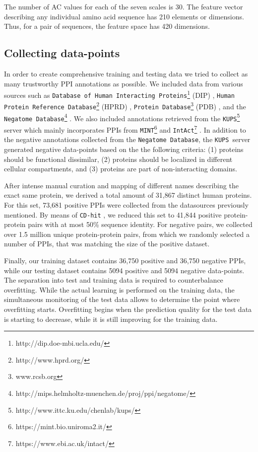 \documentclass[3p,times,twocolumn]{elsarticle}
\newcommand{\nega}{\texttt{Negatome Database}}
\newcommand{\kups}{\texttt{KUPS}}
\begin{document}
The number of AC values for each of the seven scales is 30. 
The feature vector describing any individual amino acid sequence has 210 elements or dimensions.
Thus, for a pair of sequences, the feature space has 420 dimensions. 


\subsection{Collecting data-points}
In order to create comprehensive training and testing data we tried to
collect as many trustworthy PPI annotations as possible. We included
data from various sources such as \texttt{Database of Human
  Interacting Proteins}\footnote{http://dip.doe-mbi.ucla.edu/} (DIP)
\cite{Salwinski:2004}, \texttt{Human Protein Reference
  Database}\footnote{http://www.hprd.org/} (HPRD)
\cite{Keshava_Prasad:2009}, \texttt{Protein
  Database}\footnote{www.rcsb.org} (PDB) \cite{Berman:2000}, and the
\nega\footnote{http://mips.helmholtz-muenchen.de/proj/ppi/negatome/}
\cite{Blohm:2014}. We also included annotations retrieved from the
\kups \footnote{http://www.ittc.ku.edu/chenlab/kups/}   server
\cite{Chen:2011} which mainly incorporates PPIs from
\texttt{MINT}\footnote{https://mint.bio.uniroma2.it/}
\cite{Licata:2012} and
\texttt{IntAct}\footnote{https://www.ebi.ac.uk/intact/}
\cite{Orchard:2014}. In addition to the negative annotations collected
from the \nega, the \kups\ server generated negative data-points based
on the the following criteria: (1) proteins should be functional
dissimilar, (2) proteins should be localized in different cellular
compartments, and (3) proteins are part of non-interacting domains. 

After intense manual curation and mapping of different names describing
the exact same protein, we derived a total amount of 31,867 distinct
human proteins. For this set, 73,681 positive PPIs were collected
from the datasources previously mentioned. By means of \texttt{CD-hit}
\cite{Li:2006, Fu:2012}, we reduced this set to 41,844 positive
protein-protein pairs with at most 50\% sequence identity. For
negative pairs, we collected over 1.5 million unique protein-protein
pairs, from which we randomly selected a number of PPIs, that was
matching the size of the positive dataset.

Finally, our training dataset contains 36,750 positive and 36,750
negative PPIs, while our testing dataset contains 5094 positive and
5094 negative data-points.
The separation into test and training data is required to counterbalance overfitting.
While the actual learning is performed on the training data,
the simultaneous monitoring of the test data allows to determine the point where overfitting starts.
Overfitting begins when the prediction quality for the test data is starting to decrease,
while it is still improving for the training data.
\end{document}
